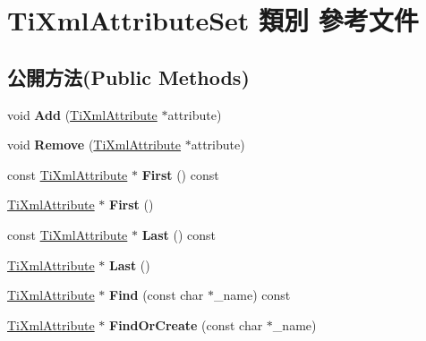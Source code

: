 \hypertarget{class_ti_xml_attribute_set}{}\section{Ti\+Xml\+Attribute\+Set 類別 參考文件}
\label{class_ti_xml_attribute_set}
\subsection*{公開方法(Public Methods)}
\begin{DoxyCompactItemize}
\item 
void {\bfseries Add} (\hyperlink{class_ti_xml_attribute}{Ti\+Xml\+Attribute} $\ast$attribute)\hypertarget{class_ti_xml_attribute_set_a745e50ddaae3bee93e4589321e0b9c1a}{}\label{class_ti_xml_attribute_set_a745e50ddaae3bee93e4589321e0b9c1a}

\item 
void {\bfseries Remove} (\hyperlink{class_ti_xml_attribute}{Ti\+Xml\+Attribute} $\ast$attribute)\hypertarget{class_ti_xml_attribute_set_a924a73d071f2573f9060f0be57879c57}{}\label{class_ti_xml_attribute_set_a924a73d071f2573f9060f0be57879c57}

\item 
const \hyperlink{class_ti_xml_attribute}{Ti\+Xml\+Attribute} $\ast$ {\bfseries First} () const \hypertarget{class_ti_xml_attribute_set_ae0636e88cedd4b09d61c451860f68598}{}\label{class_ti_xml_attribute_set_ae0636e88cedd4b09d61c451860f68598}

\item 
\hyperlink{class_ti_xml_attribute}{Ti\+Xml\+Attribute} $\ast$ {\bfseries First} ()\hypertarget{class_ti_xml_attribute_set_a99703bb08ca2aece2d7ef835de339ba0}{}\label{class_ti_xml_attribute_set_a99703bb08ca2aece2d7ef835de339ba0}

\item 
const \hyperlink{class_ti_xml_attribute}{Ti\+Xml\+Attribute} $\ast$ {\bfseries Last} () const \hypertarget{class_ti_xml_attribute_set_a7b3f3ccf39a97bc25539d3fcc540296a}{}\label{class_ti_xml_attribute_set_a7b3f3ccf39a97bc25539d3fcc540296a}

\item 
\hyperlink{class_ti_xml_attribute}{Ti\+Xml\+Attribute} $\ast$ {\bfseries Last} ()\hypertarget{class_ti_xml_attribute_set_ab4c4edfb2d74f6ea31aae096743bd6e0}{}\label{class_ti_xml_attribute_set_ab4c4edfb2d74f6ea31aae096743bd6e0}

\item 
\hyperlink{class_ti_xml_attribute}{Ti\+Xml\+Attribute} $\ast$ {\bfseries Find} (const char $\ast$\+\_\+name) const \hypertarget{class_ti_xml_attribute_set_af3675cc2bfd0aea153cda1cfcdd1f77e}{}\label{class_ti_xml_attribute_set_af3675cc2bfd0aea153cda1cfcdd1f77e}

\item 
\hyperlink{class_ti_xml_attribute}{Ti\+Xml\+Attribute} $\ast$ {\bfseries Find\+Or\+Create} (const char $\ast$\+\_\+name)\hypertarget{class_ti_xml_attribute_set_a5e28f5d32f048fba85d04dc317495bdc}{}\label{class_ti_xml_attribute_set_a5e28f5d32f048fba85d04dc317495bdc}

\end{DoxyCompactItemize}


